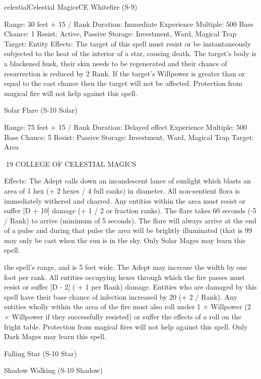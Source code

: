 \begin{College}[1.3]{celestial}{Celestial Magics}{CE}
Whitefire (S-9) 

Range: 30 feet + 15 / Rank 
Duration: Immediate 
Experience Multiple: 500 
Base Chance: 1%
Resist: Active, Passive 
Storage: Investment, Ward, Magical Trap 
Target: Entity 
Effects:  The  target  of  this  spell  must  resist  or  be 
instantaneously subjected to the heat of the interior 
of  a  star,  causing  death.  The  target’s  body  is  a 
blackened husk, their skin needs to be regenerated 
and their chance of resurrection is reduced by 2%
Rank.  If  the  target’s  Willpower  is  greater  than  or 
equal to the cast chance then the target will not be 
affected. Protection from magical fire will not help 
against this spell. 

Solar Flare (S-10 Solar) 

Range: 75 feet + 15 / Rank 
Duration: Delayed effect 
Experience Multiple: 500 
Base Chance: 5%
Resist: Passive 
Storage: Investment, Ward, Magical Trap 
Target: Area 

19 COLLEGE OF CELESTIAL MAGICS 

Effects:  The  Adept  calls  down  an  incandescent 
lance of sunlight which blasts an area of 1 hex (+ 2 
hexes  /  4  full  ranks)  in  diameter.  All  non-sentient 
flora  is  immediately  withered  and  charred.  Any 
entities  within  the  area  must  resist  or  suffer  [D  + 
10]  damage  (+  1  /  2  or  fraction  ranks).  The  flare 
takes 60 seconds (-5 / Rank) to arrive (minimum of 
5 seconds). The flare  will always arrive at the end 
of  a  pulse  and  during  that  pulse  the  area  will  be 
brightly illuminated (that is 99%
may only be cast when the sun is in the sky. Only 
Solar Mages may learn this spell. 

the  spell’s  range,  and  is  5  feet  wide.  The  Adept 
may  increase  the  width  by  one  foot  per  rank.  All 
entities  occupying  hexes  through  which  the  fire 
passes must resist or suffer [D - 2] ( + 1 per Rank) 
damage.  Entities  who  are  damaged  by  this  spell 
have their base chance of infection increased by 20 
(+ 2 / Rank). Any entities wholly within the area of 
the  fire  must  also  roll  under  1  ×  Willpower  (2  × 
Willpower  if  they  successfully  resisted)  or  suffer 
the  effects  of  a  roll  on  the  fright  table.  Protection 
from magical  fires  will  not  help  against  this  spell. 
Only Dark Mages may learn this spell. 

Falling Star (S-10 Star) 

Shadow Walking (S-10 Shadow) 


\end{College}
